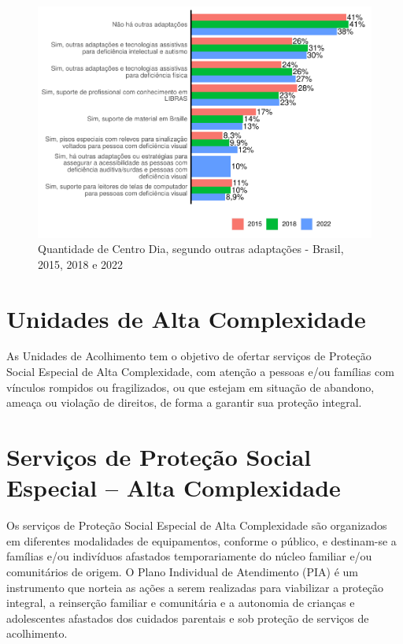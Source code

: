 \documentclass[
  brazilian]{report}
\begin{document}
\begin{figure}
\includegraphics{Censo-SUAS-2022_files/figure-latex/cdia_adaptações-1} \caption[Quantidade de Centro Dia, segundo outras adaptações - Brasil, 2015, 2018 e 2022]{Quantidade de Centro Dia, segundo outras adaptações - Brasil, 2015, 2018 e 2022}\label{fig:cdia_adaptações}
\end{figure}

\hypertarget{unidades-de-alta-complexidade}{%
\section{Unidades de Alta
Complexidade}\label{unidades-de-alta-complexidade}}

As Unidades de Acolhimento tem o objetivo de ofertar serviços de
Proteção Social Especial de Alta Complexidade, com atenção a pessoas
e/ou famílias com vínculos rompidos ou fragilizados, ou que estejam em
situação de abandono, ameaça ou violação de direitos, de forma a
garantir sua proteção integral.

\hypertarget{serviuxe7os-de-proteuxe7uxe3o-social-especial-alta-complexidade}{%
\section{Serviços de Proteção Social Especial -- Alta
Complexidade}\label{serviuxe7os-de-proteuxe7uxe3o-social-especial-alta-complexidade}}

Os serviços de Proteção Social Especial de Alta Complexidade são
organizados em diferentes modalidades de equipamentos, conforme o
público, e destinam-se a famílias e/ou indivíduos afastados
temporariamente do núcleo familiar e/ou comunitários de origem. O Plano
Individual de Atendimento (PIA) é um instrumento que norteia as ações a
serem realizadas para viabilizar a proteção integral, a reinserção
familiar e comunitária e a autonomia de crianças e adolescentes
afastados dos cuidados parentais e sob proteção de serviços de
acolhimento.
\end{document}
